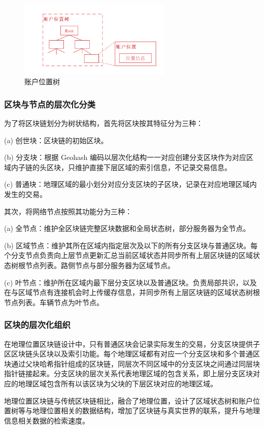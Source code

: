 \begin{figure}
  \centering
  \includegraphics[width=0.65\textwidth]{figures/账户位置树}
  \caption{账户位置树}\label{fig:accountLocation}
\end{figure}

\subsubsection{区块与节点的层次化分类}
为了将区块链划分为树状结构，首先将区块按其特征分为三种：\par
(a) 创世块：区块链的初始区块。\par
(b) 分支块：根据 Geohash 编码以层次化结构一一对应创建分支区块作为对应区域内子链的头区块，只维护直接下层区域的索引信息，不记录交易信息。\par
(c) 普通块：地理区域的最小划分对应分支区块的子区块，记录在对应地理区域内发生的交易。\par

其次，将网络节点按照其功能分为三种：\par
(a) 全节点：维护全区块链完整区块数据和全局状态树，部分服务器为全节点。\par

(b) 区域节点：维护其所在区域内指定层次及以下的所有分支区块与普通区块。每个分支节点负责向上层节点更新汇总当前区域状态并同步所有上层区块链的区域状态树根节点列表。路侧节点与部分服务器为区域节点。\par
(c) 叶节点：维护所在区域内最下层分支区块以及普通区块。负责局部共识，以及在与区域节点有连接机会时上传缓存信息，并同步所有上层区块链的区域状态树根节点列表。车辆节点为叶节点。\par
\subsubsection{区块的层次化组织}
在地理位置区块链设计中，只有普通区块会记录实际发生的交易，分支区块提供子区区块链头区块以及索引功能。每个地理区域都有对应一个分支区块和多个普通区块通过父块哈希指针组成的区块链，同层次不同区域中的分支区块之间通过同层块指针链接起来。分支区块的层次关系代表地理区域的包含关系，即上层分支区块对应的地理区域包含所有以该区块为父块的下层区块对应的地理区域。\par
地理位置区块链与传统区块链相比，融合了地理位置，设计了区域状态树和账户位置树等与地理位置相关的数据结构，增加了区块链与真实世界的联系，提升与地理信息相关数据的检索速度。\par

